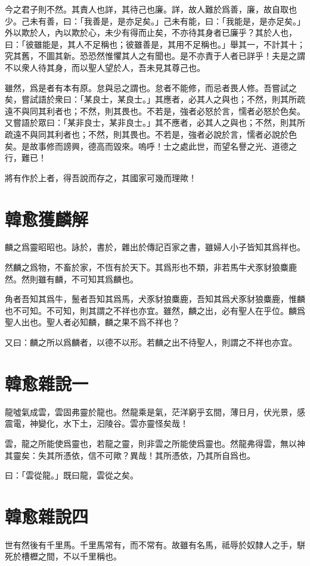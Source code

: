 今之君子則不然。其責人也詳，其待己也廉。詳，故人難於爲善，廉，故自取也少。己未有善，曰：「我善是，是亦足矣。」己未有能，曰：「我能是，是亦足矣。」外以欺於人，內以欺於心，未少有得而止矣，不亦待其身者已廉乎？其於人也，曰：「彼雖能是，其人不足稱也；彼雖善是，其用不足稱也。」舉其一，不計其十；究其舊，不圖其新。恐恐然惟懼其人之有聞也。是不亦責于人者已詳乎！夫是之謂不以衆人待其身，而以聖人望於人，吾未見其尊己也。

雖然，爲是者有本有原。怠與忌之謂也。怠者不能修，而忌者畏人修。吾嘗試之矣，嘗試語於衆曰：「某良士，某良士。」其應者，必其人之與也；不然，則其所疏遠不與同其利者也；不然，則其畏也。不若是，強者必怒於言，懦者必怒於色矣。又嘗語於眾曰：「某非良士，某非良士。」其不應者，必其人之與也；不然，則其所疏遠不與同其利者也；不然，則其畏也。不若是，強者必說於言，懦者必說於色矣。是故事修而謗興，德高而毀來。嗚呼！士之處此世，而望名譽之光、道德之行，難已！

將有作於上者，得吾說而存之，其國家可幾而理歟！

\section[獲麟解\quad{\small 韓愈}]{{\normalsize 韓愈}\quad 獲麟解}
麟之爲靈昭昭也。詠於，書於，雜出於傳記百家之書，雖婦人小子皆知其爲祥也。

然麟之爲物，不畜於家，不恆有於天下。其爲形也不類，非若馬牛犬豕豺狼麋鹿然。然則雖有麟，不可知其爲麟也。

角者吾知其爲牛，鬛者吾知其爲馬，犬豕豺狼麋鹿，吾知其爲犬豕豺狼麋鹿，惟麟也不可知。不可知，則其謂之不祥也亦宜。雖然，麟之出，必有聖人在乎位。麟爲聖人出也。聖人者必知麟，麟之果不爲不祥也？

又曰：麟之所以爲麟者，以德不以形。若麟之出不待聖人，則謂之不祥也亦宜。

\section[雜說一\quad{\small 韓愈}]{{\normalsize 韓愈}\quad 雜說一}
龍噓氣成雲，雲固弗靈於龍也。然龍乘是氣，茫洋窮乎玄間，薄日月，伏光景，感震電，神變化，水下土，汩陵谷。雲亦靈怪矣哉！

雲，龍之所能使爲靈也，若龍之靈，則非雲之所能使爲靈也。然龍弗得雲，無以神其靈矣：失其所憑依，信不可歟？異哉！其所憑依，乃其所自爲也。

曰：「雲從龍。」既曰龍，雲從之矣。

\section[雜說四\quad{\small 韓愈}]{{\normalsize 韓愈}\quad 雜說四}
世有然後有千里馬。千里馬常有，而不常有。故雖有名馬，祗辱於奴隸人之手，駢死於槽櫪之間，不以千里稱也。

